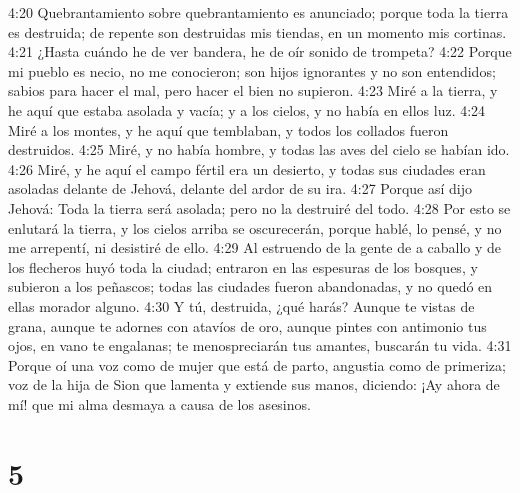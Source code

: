 4:20 Quebrantamiento sobre quebrantamiento es anunciado; porque toda la tierra es destruida; de repente son destruidas mis tiendas, en un momento mis cortinas.  
4:21 ¿Hasta cuándo he de ver bandera, he de oír sonido de trompeta?  
4:22 Porque mi pueblo es necio, no me conocieron; son hijos ignorantes y no son entendidos; sabios para hacer el mal, pero hacer el bien no supieron.  
4:23 Miré a la tierra, y he aquí que estaba asolada y vacía; y a los cielos, y no había en ellos luz.  
4:24 Miré a los montes, y he aquí que temblaban, y todos los collados fueron destruidos.  
4:25 Miré, y no había hombre, y todas las aves del cielo se habían ido.  
4:26 Miré, y he aquí el campo fértil era un desierto, y todas sus ciudades eran asoladas delante de Jehová, delante del ardor de su ira.  
4:27 Porque así dijo Jehová: Toda la tierra será asolada; pero no la destruiré del todo.  
4:28 Por esto se enlutará la tierra, y los cielos arriba se oscurecerán, porque hablé, lo pensé, y no me arrepentí, ni desistiré de ello.  
4:29 Al estruendo de la gente de a caballo y de los flecheros huyó toda la ciudad; entraron en las espesuras de los bosques, y subieron a los peñascos; todas las ciudades fueron abandonadas, y no quedó en ellas morador alguno.  
4:30 Y tú, destruida, ¿qué harás? Aunque te vistas de grana, aunque te adornes con atavíos de oro, aunque pintes con antimonio tus ojos, en vano te engalanas; te menospreciarán tus amantes, buscarán tu vida.  
4:31 Porque oí una voz como de mujer que está de parto, angustia como de primeriza; voz de la hija de Sion que lamenta y extiende sus manos, diciendo: ¡Ay ahora de mí! que mi alma desmaya a causa de los asesinos.  

\chapter{5}


